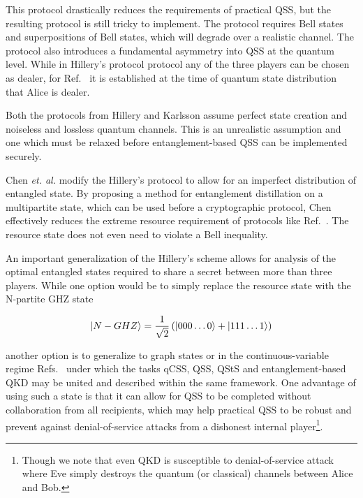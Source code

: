 This protocol drastically reduces the requirements of practical QSS, but the resulting protocol is still tricky to implement. The protocol requires Bell states and superpositions of Bell states, which will degrade over a realistic channel.  The protocol also introduces a fundamental asymmetry into QSS at the quantum level. While in Hillery's protocol protocol any of the three players can be chosen as dealer, for Ref.~\cite{Karlsson1999} it is established at the time of quantum state distribution that Alice is dealer. %

Both the protocols from Hillery \cite{Hillery1999} and Karlsson \cite{Karlsson1999} assume perfect state creation and noiseless and lossless quantum channels. This is an unrealistic assumption and one which must be relaxed before entanglement-based QSS can be implemented securely. 

Chen \emph{et. al.} \cite{Chen2005a} modify the Hillery's protocol \cite{Hillery1999} to allow for an imperfect distribution of entangled state. By proposing a method for entanglement distillation on a multipartite state, which can be used before a cryptographic protocol, Chen effectively reduces the extreme resource requirement of protocols like Ref.~\cite{Hillery1999}. The resource state does not even need to violate a Bell inequality.

An important generalization of the Hillery's scheme allows for analysis of the optimal entangled states required to share a secret between more than three players. While one option would be to simply replace the resource state with the N-partite GHZ state

\begin{equation}
\ket{N-GHZ} = \frac{1}{\sqrt{2}}\left(\ket{000\dots0} + \ket{111\dots1} \right)
\end{equation}

\noindent another option is to generalize to graph states \cite{Markham2008a, Keet2010} or in the continuous-variable regime Refs.~\cite{Lau2013, Wu2016} under which the tasks qCSS, QSS, QStS and entanglement-based QKD may be united and described within the same framework. %
One advantage of using such a state is that it can allow for QSS to be completed without collaboration from all recipients, which may help practical QSS to be robust and prevent against denial-of-service attacks from a dishonest internal player\footnote{Though we note that even QKD is susceptible to denial-of-service attack where Eve simply destroys the quantum (or classical) channels between Alice and Bob.}.

